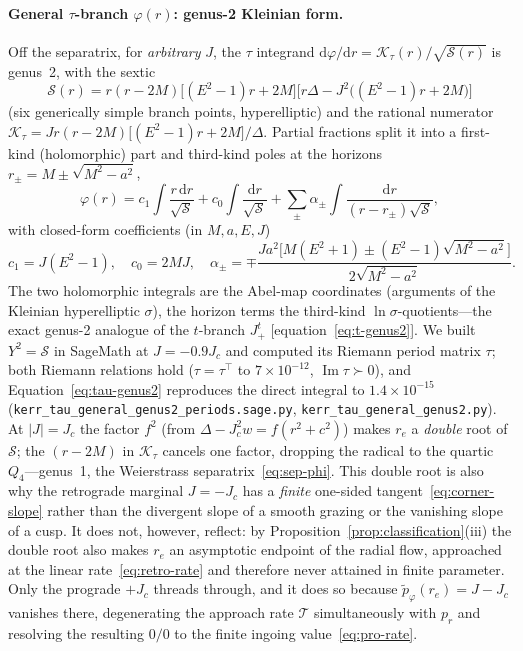 \documentclass[12pt]{iopart}
\theoremstyle{plain}
\theoremstyle{definition}
\theoremstyle{remark}
\newcommand{\re}{r_{e}}
\newcommand{\Jc}{J_{c}}
\newcommand{\dd}{\mathrm{d}}
\begin{document}
\paragraph{General $\tau$-branch $\varphi(r)$: genus-2 Kleinian form.} Off the
separatrix, for \emph{arbitrary} $J$, the $\tau$ integrand
$\dd\varphi/\dd r=\mathcal K_\tau(r)/\sqrt{\mathcal S(r)}$ is genus~2, with the
sextic
\begin{equation}
    \mathcal S(r)=r(r-2M)\big[(E^2-1)r+2M\big]
      \big[r\Delta-J^2\big((E^2-1)r+2M\big)\big]
    \label{eq:tau-sextic}
\end{equation}
(six generically simple branch points, hyperelliptic) and the rational numerator
$\mathcal K_\tau=Jr(r-2M)\big[(E^2-1)r+2M\big]/\Delta$. Partial fractions split it
into a first-kind (holomorphic) part and third-kind poles at the horizons
$r_\pm=M\pm\sqrt{M^2-a^2}$,
\begin{equation}
    \varphi(r)=c_1\!\int\!\frac{r\,\dd r}{\sqrt{\mathcal S}}
      +c_0\!\int\!\frac{\dd r}{\sqrt{\mathcal S}}
      +\sum_{\pm}\alpha_\pm\!\int\!\frac{\dd r}{(r-r_\pm)\sqrt{\mathcal S}},
    \label{eq:tau-genus2}
\end{equation}
with closed-form coefficients (in $M,a,E,J$)
\begin{equation}
    c_1=J(E^2-1),\quad c_0=2MJ,\quad
    \alpha_\pm=\mp\frac{Ja^2\big[M(E^2+1)\pm(E^2-1)\sqrt{M^2-a^2}\big]}
      {2\sqrt{M^2-a^2}}.
    \label{eq:tau-coeffs}
\end{equation}
The two holomorphic integrals are the Abel-map coordinates (arguments of the
Kleinian hyperelliptic $\sigma$), the horizon terms the third-kind
$\ln\sigma$-quotients---the exact genus-2 analogue of the $t$-branch $J_+^t$
[equation~\eqref{eq:t-genus2}]. We built $Y^2=\mathcal S$ in SageMath at $J=-0.9\Jc$
and computed its Riemann period matrix $\tau$; both Riemann relations hold
($\tau=\tau^\top$ to $7\times10^{-12}$, $\operatorname{Im}\tau\succ0$), and
Equation~\eqref{eq:tau-genus2} reproduces the direct integral to $1.4\times10^{-15}$
(\texttt{kerr\_tau\_general\_genus2\_periods.sage.py},
\texttt{kerr\_tau\_general\_genus2.py}). At
$|J|=\Jc$ the factor $f^2$ (from $\Delta-\Jc^2w=f(r^2+c^2)$) makes $r_e$ a
\emph{double} root of $\mathcal S$; the $(r-2M)$ in $\mathcal K_\tau$ cancels one
factor, dropping the radical to the quartic $Q_4$---genus~1, the Weierstrass
separatrix~\eqref{eq:sep-phi}. This double root is also why the retrograde
marginal $J=-\Jc$ has a \emph{finite} one-sided tangent~\eqref{eq:corner-slope}
rather than the divergent slope of a smooth grazing or the vanishing slope of a
cusp. It does not, however, reflect: by
Proposition~\ref{prop:classification}(iii) the double root also makes $\re$ an
asymptotic endpoint of the radial flow, approached at the linear
rate~\eqref{eq:retro-rate} and therefore never attained in finite parameter. Only
the prograde $+\Jc$ threads through, and it does so because
$\tilde p_\varphi(\re)=J-\Jc$ vanishes there, degenerating the approach rate
$\mathcal T$ simultaneously with $p_r$ and resolving the resulting $0/0$ to the
finite ingoing value~\eqref{eq:pro-rate}.
\end{document}
